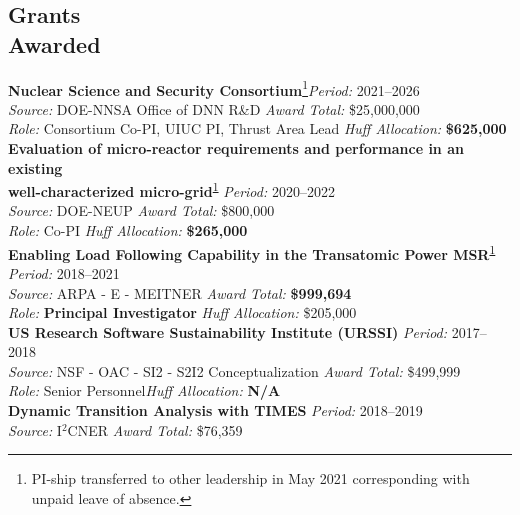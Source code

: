 \documentclass[margin,line]{resume}
\begin{document}
\begin{resume}
    \section{\mysidestyle Grants\\Awarded}
    \textbf{Nuclear Science and Security Consortium}\footnote{\label{footnote-label}PI-ship transferred to other leadership in May 2021 corresponding with unpaid leave of absence.}\hfill\textsl{Period:} 2021--2026\\
    \textsl{Source:} DOE-NNSA Office of DNN R\&D \hfill \textsl{Award Total:} \$25,000,000\\
    \textsl{Role:} Consortium Co-PI, UIUC PI, Thrust Area Lead \hfill \textsl{Huff Allocation:} \textbf{\$625,000}\vspace{2mm}\\%
    \textbf{Evaluation of micro-reactor requirements and performance in an 
    existing \\
    well-characterized micro-grid}\textsuperscript{\ref{footnote-label}} \hfill \textsl{Period:} 2020--2022\\
    \textsl{Source:} DOE-NEUP \hfill \textsl{Award Total:} \$800,000\\
    \textsl{Role:} Co-PI \hfill \textsl{Huff Allocation:} \textbf{\$265,000}\vspace{2mm}\\%
    \textbf{Enabling Load Following Capability in the Transatomic Power MSR}\textsuperscript{\ref{footnote-label}} \hfill \textsl{Period:}
    2018--2021\\
    \textsl{Source:} ARPA - E - MEITNER \hfill \textsl{Award Total:} \textbf{\$999,694}\\
    \textsl{Role:} \textbf{Principal Investigator} \hfill \textsl{Huff Allocation:} \$205,000\vspace{2mm}\\%
    \textbf{US Research Software Sustainability Institute (URSSI)} \hfill \textsl{Period:}
    2017--2018\\
    \textsl{Source:} NSF - OAC - SI2 - S2I2 Conceptualization \hfill \textsl{Award Total:} \$499,999\\
    \textsl{Role:} Senior Personnel\hfill \textsl{Huff Allocation:} \textbf{N/A}\vspace{2mm}\\%
    \textbf{Dynamic Transition Analysis with TIMES} \hfill \textsl{Period:}
    2018--2019\\
    \textsl{Source:} I$^2$CNER \hfill \textsl{Award Total:} \$76,359\\

\end{resume}
\end{document}
